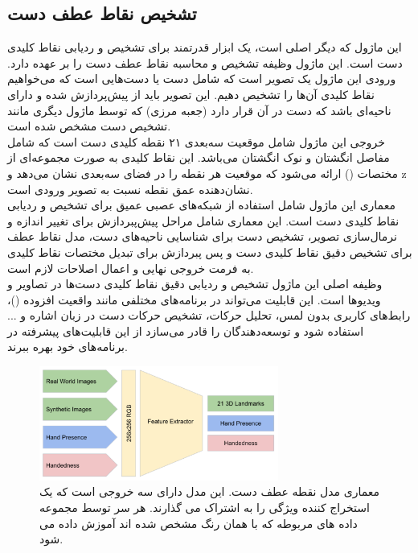 \subsection{تشخیص نقاط عطف دست \protect{}}
این ماژول که دیگر اصلی است،  یک ابزار قدرتمند برای تشخیص و ردیابی نقاط کلیدی دست است. این ماژول وظیفه تشخیص و محاسبه نقاط عطف دست را بر عهده دارد. ورودی این ماژول یک تصویر است که شامل دست یا دست‌هایی 
است که می‌خواهیم نقاط کلیدی آن‌ها را تشخیص دهیم. این تصویر باید از پیش‌پردازش شده و دارای ناحیه‌ای باشد که دست در آن قرار دارد  (جعبه مرزی) که توسط ماژول دیگری مانند تشخیص دست مشخص شده است.
\\
خروجی این ماژول شامل موقعیت سه‌بعدی ۲۱ نقطه کلیدی دست است که شامل مفاصل انگشتان و نوک انگشتان می‌باشد. این نقاط کلیدی به صورت مجموعه‌ای از مختصات () ارائه می‌شود 
که موقعیت هر نقطه را در فضای سه‌بعدی نشان می‌دهد و z نشان‌دهنده عمق نقطه نسبت به تصویر ورودی است.
\\
معماری این ماژول شامل استفاده از شبکه‌های عصبی عمیق برای تشخیص و ردیابی نقاط کلیدی دست است. این معماری شامل مراحل پیش‌پبردازش برای تغییر اندازه و نرمال‌سازی تصویر، تشخیص دست برای شناسایی ناحیه‌های دست، مدل 
نقاط عطف برای تشخیص دقیق نقاط کلیدی دست و پس‌ پبردازش برای تبدیل مختصات نقاط کلیدی به فرمت خروجی نهایی و اعمال اصلاحات لازم است.
\\
وظیفه اصلی این ماژول تشخیص و ردیابی دقیق نقاط کلیدی دست‌ها در تصاویر و ویدیوها است. این قابلیت می‌تواند در برنامه‌های مختلفی مانند واقعیت افزوده ()، رابط‌های کاربری بدون لمس،
تحلیل حرکات، تشخیص حرکات دست در زبان اشاره و ... استفاده شود و توسعه‌دهندگان را قادر می‌سازد از این قابلیت‌های پیشرفته در برنامه‌های خود بهره ببرند.
\cite{zhang2020mediapipe}


\begin{figure}[h]
    \centering
    \includegraphics[width=0.7\textwidth]{landmark.png}
    \caption{معماری مدل نقطه عطف دست. این مدل دارای سه خروجی است که یک استخراج کننده ویژگی را به اشتراک می گذارند. هر سر توسط مجموعه داده های مربوطه که با همان رنگ مشخص شده اند آموزش داده می شود.}
\end{figure}

